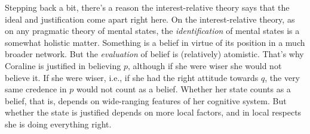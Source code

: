 {Stepping back a bit, there's a reason the interest-relative theory says that the ideal and justification come apart right here. On the interest-relative theory, as on any pragmatic theory of mental states, the \textit{identification} of mental states is a somewhat holistic matter. Something is a belief in virtue of its position in a much broader network. But the \textit{evaluation} of belief is (relatively) atomistic. That's why Coraline is justified in believing $p$, although if she were wiser she would not believe it. If she were wiser, i.e., if she had the right attitude towards $q$, the very same credence in $p$ would not count as a belief. Whether her state counts as a belief, that is, depends on wide-ranging features of her cognitive system. But whether the state is justified depends on more local factors, and in local respects she is doing everything right.}

